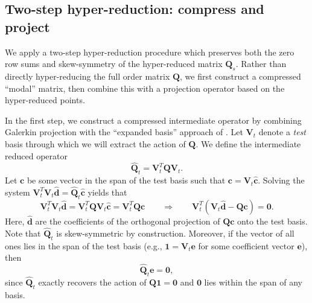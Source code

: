 \documentclass[review]{siamart171218}
\theoremstyle{assumption}
\renewcommand{\hat}{\widehat}
\newcommand{\LRp}[1]{\left( #1 \right)}
\begin{document}
\subsection{Two-step hyper-reduction: compress and project}

We apply a two-step hyper-reduction procedure which preserves both the zero row sums and skew-symmetry of the hyper-reduced matrix $\bm{Q}_s$.  Rather than directly hyper-reducing the full order matrix $\bm{Q}$, we first construct a compressed ``modal'' matrix, then combine this with a projection operator based on the hyper-reduced points.  

In the first step, we construct a compressed intermediate operator by combining  Galerkin projection with the ``expanded basis'' approach of \cite{hernandez2017dimensional}.  Let $\bm{V}_t$ denote a \textit{test} basis through which we will extract the action of $\bm{Q}$.  We define the intermediate reduced operator 
\begin{equation}
\hat{\bm{Q}}_{t} = \bm{V}_{t}^T\bm{Q}\bm{V}_{t}.
\label{eq:compressQ}
\end{equation}
Let $\bm{c}$ be some vector in the span of the test basis such that $\bm{c}=\bm{V}_t \hat{\bm{c}}$. Solving the system $\bm{V}_t^T\bm{V}_t \hat{\bm{d}} = \hat{\bm{Q}}_t\hat{\bm{c}}$ yields that
\[
\bm{V}_t^T\bm{V}_t \hat{\bm{d}} = \bm{V}_t^T\bm{Q}\bm{V}_t\hat{\bm{c}} = \bm{V}_t^T\bm{Q}\bm{c} \qquad \Longrightarrow\qquad \bm{V}_t^T \LRp{\bm{V}_t\hat{\bm{d}}-\bm{Q}\bm{c}} = \bm{0}.
\]
Here, $\hat{\bm{d}}$ are the coefficients of the orthogonal projection of $\bm{Q}\bm{c}$ onto the test basis.  Note that $\hat{\bm{Q}}_t$ is skew-symmetric by construction.  Moreover, if the vector of all ones lies in the span of the test basis (e.g., $\bm{1} = \bm{V}_t\bm{e}$ for some coefficient vector $\bm{e}$), then 
\[
\hat{\bm{Q}}_t\bm{e} = \bm{0},
\]
since $\hat{\bm{Q}}_t$ exactly recovers the action of $\bm{Q}\bm{1} = \bm{0}$ and $\bm{0}$ lies within the span of any basis.  

\end{document}
